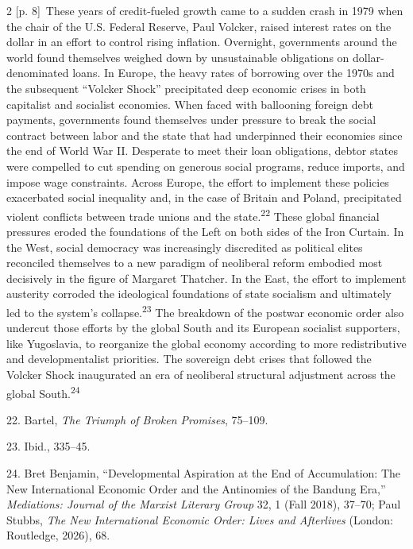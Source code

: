 \documentclass[10pt,a4paper]{article}
\begin{document}
\begin{paracol}{2}
{\scriptsize\color{gray} [p. 8]}\ These years of credit-fueled growth came to a sudden crash in 1979 when the chair of the U.S. Federal Reserve, Paul Volcker, raised interest rates on the dollar in an effort to control rising inflation. Overnight, governments around the world found themselves weighed down by unsustainable obligations on dollar-denominated loans. In Europe, the heavy rates of borrowing over the 1970s and the subsequent “Volcker Shock” precipitated deep economic crises in both capitalist and socialist economies. When faced with ballooning foreign debt payments, governments found themselves under pressure to break the social contract between labor and the state that had underpinned their economies since the end of World War II. Desperate to meet their loan obligations, debtor states were compelled to cut spending on generous social programs, reduce imports, and impose wage constraints. Across Europe, the effort to implement these policies exacerbated social inequality and, in the case of Britain and Poland, precipitated violent conflicts between trade unions and the state.\nobreak\textsuperscript{22} These global financial pressures eroded the foundations of the Left on both sides of the Iron Curtain. In the West, social democracy was increasingly discredited as political elites reconciled themselves to a new paradigm of neoliberal reform embodied most decisively in the figure of Margaret Thatcher. In the East, the effort to implement austerity corroded the ideological foundations of state socialism and ultimately led to the system’s collapse.\nobreak\textsuperscript{23} The breakdown of the postwar economic order also undercut those efforts by the global South and its European socialist supporters, like Yugoslavia, to reorganize the global economy according to more redistributive and developmentalist priorities. The sovereign debt crises that followed the Volcker Shock inaugurated an era of neoliberal structural adjustment across the global South.\nobreak\textsuperscript{24}\par{\small 22. Bartel, \textit{The Triumph of Broken Promises}, 75–109.\par}{\small 23. Ibid., 335–45.\par}{\small 24. Bret Benjamin, “Developmental Aspiration at the End of Accumulation: The New International Economic Order and the Antinomies of the Bandung Era,” \textit{Mediations: Journal of the Marxist Literary Group} 32, 1 (Fall 2018), 37–70; Paul Stubbs, \textit{The New International Economic Order: Lives and Afterlives} (London: Routledge, 2026), 68.\par}

\end{paracol}
\end{document}
